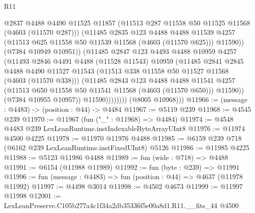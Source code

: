 \begin{lexlean}{R11}
\begin{coremodule}
                          @2837
                          @4488
                          @4490
                          @11525
                          @11857
                          (@11513 @287 @11558 @50 @11525 @11568 (@4603 (@11570 @287)))
                          (@11485
                            @2835
                            @123
                            @4488
                            @4488
                            @11539
                            @4257
                            (@11513 @625 @11558 @50 @11539 @11568 (@4603 (@11570 @625)))
                            @11590))
                        (@7384 @10949 @10951))
                      (@11485
                        @2847
                        @123
                        @4493
                        @4488
                        @10959
                        @4257
                        (@11493
                          @2846
                          @4491
                          @4488
                          (@11528 @11543)
                          @10959
                          (@11485
                            @2841
                            @2845
                            @4488
                            @4490
                            @11527
                            @11543
                            (@11513 @338 @11558 @50 @11527 @11568 (@4603 (@11570 @338)))
                            (@11485
                              @2843
                              @123
                              @4488
                              @4488
                              @11541
                              @4257
                              (@11513 @650 @11558 @50 @11541 @11568 (@4603 (@11570 @650)))
                              @11590))
                          (@7384 @10955 @10957))
                        @11590))))))))
        (@8005 @10968)))
@11966 := (message : @4483) -> (position : @44) -> @4484
@11967 := @5119 @239
@11968 := @4545 @239
@11970 := @11967 (fun ("_" : @11968) => @4484)
@11974 := @4548 @4483 @239 LexLeanRuntime.instIndexableByteArrayUInt8
@11976 := @11974 @4500 @4225
@11978 := @11970 @11976 @4488
@11985 := @6159 @239 @718 (@6162 @239 LexLeanRuntime.instFixedUInt8) @5126
@11986 := @11985 @4225
@11988 := @5123 @11986 @4488
@11989 := fun (wide : @718) => @4488
@11991 := @6154 (@11988 @11989)
@11992 := fun (byte : @239) => @11991
@11996 := fun (message : @4483) => fun (position : @44) => @4637 (@11978 @11992)
@11997 := @4498 @3014
@11998 := @4502 @4673
@11999 := @11997 @11998
@12001 := LexLeanPreserve.C105b277a4c1f34a2db35336f5e00a8d1.R11.__fits_44 @4500

\end{coremodule}
\end{lexlean}
